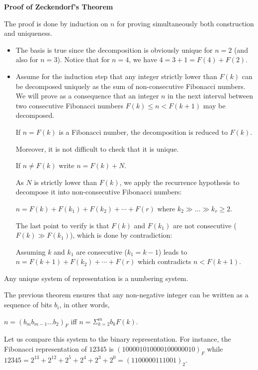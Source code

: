 \noindent \textbf{Proof of Zeckendorf's Theorem}

The proof is done by induction on $n$ for proving simultaneously both construction and uniqueness.

\begin{itemize}
\item
The basis is true since the decomposition is obviously unique for $n=2$ (and also for $n=3$). 
Notice that for $n=4$, we have $4 = 3 + 1 = F(4) + F(2)$. 

\item
Assume for the induction step that any integer strictly lower than $F(k)$ can be decomposed uniquely as the sum of non-consecutive Fibonacci numbers.
We will prove as a consequence that an integer $n$ in the next interval between two consecutive Fibonacci numbers $F(k) \leq n < F(k+1)$ may be decomposed. 

If $n=F(k)$ is a Fibonacci number, the decomposition is reduced to $F(k)$.

Moreover, it is not difficult to check that it is unique.


\medskip

If $n \neq F(k)$ write $n = F(k) + N$.

As $N$ is strictly lower than $F(k)$, we apply the recurrence hypothesis to decompose it into non-consecutive Fibonacci numbers:

$n = F(k) + F(k_1) + F(k_2) + \cdots + F(r)$ where $k_2 \gg ... \gg k_r \geq 2$. 

The last point to verify is that $F(k)$ and $F(k_1)$ are not consecutive ($F(k) \gg F(k_1)$), which is done by contradiction:

Assuming $k$ and $k_1$ are consecutive ($k_1=k-1$) leads to $n = F(k+1) + F(k_2) + \cdots + F(r)$
which contradicts $n < F(k+1)$.
\end{itemize}

Any unique system of representation is a numbering system.

The previous theorem ensures that any non-negative integer can be written
as a sequence of bits $b_i$, in other words,

$n = (b_mb_{m-1}...b_2)_F$ iff $n = \Sigma_{k=2}^m b_k F(k)$.

Let us compare this system to the binary representation.
For instance, the Fibonacci representation of $12345$ is $(100001010000100000010)_F$
while  $12345 = 2^{13} + 2^{12} + 2^{5} + 2^{4} + 2^{3} + 2^{0} = (1100000111001)_2$.

